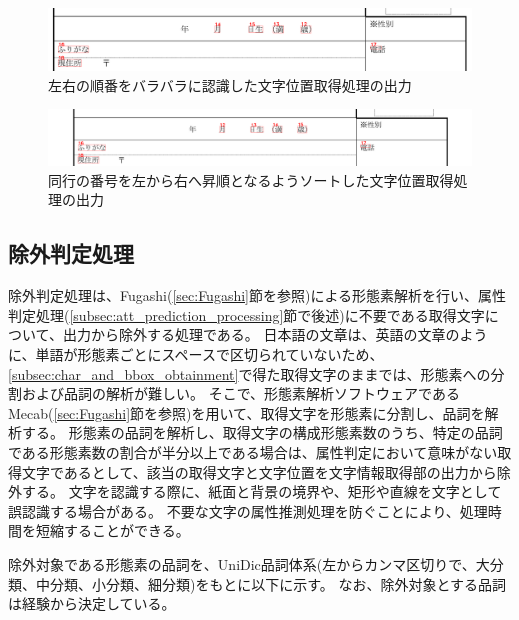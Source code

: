 \begin{figure}[t]
    \begin{center}
        \includegraphics[width=15cm]{image/04-implementation/before_sorted_string.png}
        \caption{左右の順番をバラバラに認識した文字位置取得処理の出力}
        \label{fig:before_sorted_string}
    \end{center}
\end{figure}

\begin{figure}[t]
    \begin{center}
        \includegraphics[width=15cm]{image/04-implementation/after_sorted_string.png}
        \caption{同行の番号を左から右へ昇順となるようソートした文字位置取得処理の出力}
        \label{fig:after_sorted_string}
    \end{center}
\end{figure}


\subsection{除外判定処理}\label{subsec:exclusion_judgement_processing}
除外判定処理は、Fugashi(\ref{sec:Fugashi}節を参照)による形態素解析を行い、属性判定処理(\ref{subsec:att_prediction_processing}節で後述)に不要である取得文字について、出力から除外する処理である。
日本語の文章は、英語の文章のように、単語が形態素ごとにスペースで区切られていないため、\ref{subsec:char_and_bbox_obtainment}で得た取得文字のままでは、形態素への分割および品詞の解析が難しい。
そこで、形態素解析ソフトウェアであるMecab(\ref{sec:Fugashi}節を参照)を用いて、取得文字を形態素に分割し、品詞を解析する。
形態素の品詞を解析し、取得文字の構成形態素数のうち、特定の品詞である形態素数の割合が半分以上である場合は、属性判定において意味がない取得文字であるとして、該当の取得文字と文字位置を文字情報取得部の出力から除外する。
文字を認識する際に、紙面と背景の境界や、矩形や直線を文字として誤認識する場合がある。
不要な文字の属性推測処理を防ぐことにより、処理時間を短縮することができる。

除外対象である形態素の品詞を、UniDic品詞体系(左からカンマ区切りで、大分類、中分類、小分類、細分類)をもとに以下に示す。
なお、除外対象とする品詞は経験から決定している。

